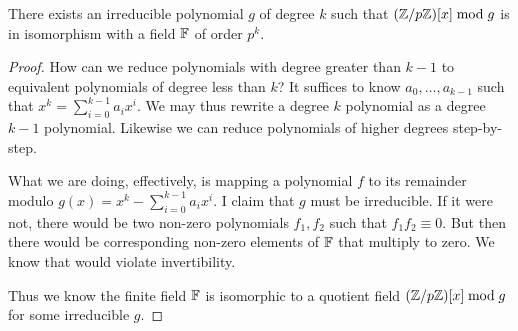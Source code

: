 \begin{lemma}
  There exists an irreducible polynomial $g$ of degree $k$ such that
  $\mathopen{}\left( {\mathbb{Z} / p\mathbb{Z}} \right)\mathclose{}[x] \bmod g$ is in isomorphism with a field $\mathbb{F}$ of
  order $p^k$.
\end{lemma}

\begin{proof}
  How can we reduce polynomials with degree greater than $k-1$ to
  equivalent polynomials of degree less than $k$? It suffices to know
  $a_0, \ldots, a_{k-1}$ such that $x^k = \sum_{i=0}^{k-1} a_i x^i$. We
  may thus rewrite a degree $k$ polynomial as a degree $k-1$ polynomial.
  Likewise we can reduce polynomials of higher degrees step-by-step.

  What we are doing, effectively, is mapping a polynomial $f$ to its
  remainder modulo $g(x) = x^k - \sum_{i=0}^{k-1} a_i x^i$. I claim that
  $g$ must be irreducible. If it were not, there would be two non-zero
  polynomials $f_1, f_2$ such that $f_1 f_2 \equiv 0$. But then there
  would be corresponding non-zero elements of $\mathbb{F}$ that multiply to
  zero. We know that would violate invertibility.

  Thus we know the finite field $\mathbb{F}$ is isomorphic to a quotient field
  $\mathopen{}\left( {\mathbb{Z} / p\mathbb{Z}} \right)\mathclose{}[x] \bmod g$ for some irreducible $g$.
\end{proof}
